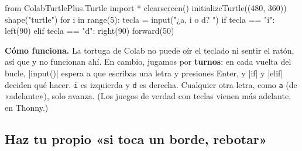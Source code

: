 \begin{tcbraster}[raster columns=2, raster equal height=rows, raster column skip=12pt, raster valign=center, raster force size=false, raster column 1/.style={width=0.36\linewidth}, raster column 2/.style={width=0.64\linewidth-12pt}]
\begin{tcolorbox}[colback=white, colframe=white, boxrule=0pt, valign=center, left=0pt, right=0pt]
\begin{scratch}[scale=0.51]
\end{scratch}
\end{tcolorbox}
\begin{code}
from ColabTurtlePlus.Turtle import *
clearscreen()
initializeTurtle((480, 360))
shape("turtle")
for i in range(5):
    tecla = input("¿a, i o d? ")
    if tecla == "i":
        left(90)
    elif tecla == "d":
        right(90)
    forward(50)
\end{code}
\end{tcbraster}

\textbf{Cómo funciona.} La tortuga de Colab no puede oír el teclado ni sentir el ratón, así que  y  no funcionan ahí. En cambio, jugamos por \textbf{turnos}: en cada vuelta del bucle, \py|input()| espera a que escribas una letra y presiones Enter, y \py|if| y \py|elif| deciden qué hacer. \texttt{i} es izquierda y \texttt{d} es derecha. Cualquier otra letra, como \texttt{a} (de «adelante»), solo avanza. (Los juegos de verdad con teclas vienen más adelante, en Thonny.)

\subsection*{Haz tu propio «si toca un borde, rebotar»}

